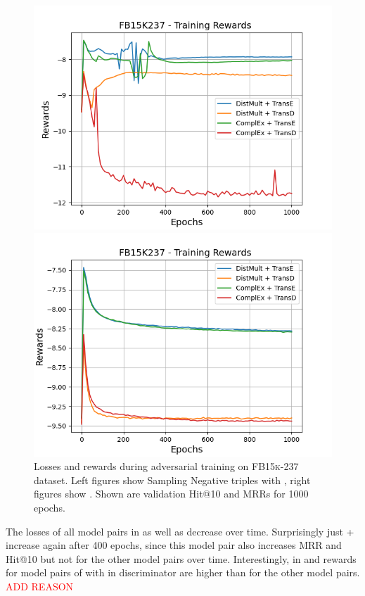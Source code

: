 \begin{figure}
    \begin{minipage}{.5\textwidth}
      \centering
      \includegraphics[width=0.9\linewidth]{figures/results/gan_train/not_pretrained/uncertainty/max/entropy/fb15k237/1k_epochs/uncertainty_fb15k237_rew.png}
    \end{minipage}%
    \begin{minipage}{.5\textwidth}
      \centering
      \includegraphics[width=0.9\linewidth]{figures/results/gan_train/not_pretrained/uncertainty/max_distribution/entropy/fb15k237/1k_epochs/uncertainty_fb15k237_rew.png}
    \end{minipage}%
    \caption{Losses and rewards during adversarial training on \textsc{FB15k-237} dataset. 
    Left figures show Sampling Negative triples with \usmax, right figures show \ussoftmax.
    Shown are validation Hit@10 and MRRs for 1000 epochs.}
    \label{fig:advtrain_fb15k237_usmax_ussoftmax_losses_rewards}
\end{figure}
The losses of all model pairs in \usmax as well as \ussoftmax decrease over time.
Surprisingly just \complex + \transe increase again after 400 epochs, since this model pair also increases MRR and Hit@10 but not for the other model pairs over time.
Interestingly, in \usmax and \ussoftmax rewards for model pairs of with \transe in discriminator are higher than for the other model pairs.
\textcolor{red}{ADD REASON}
